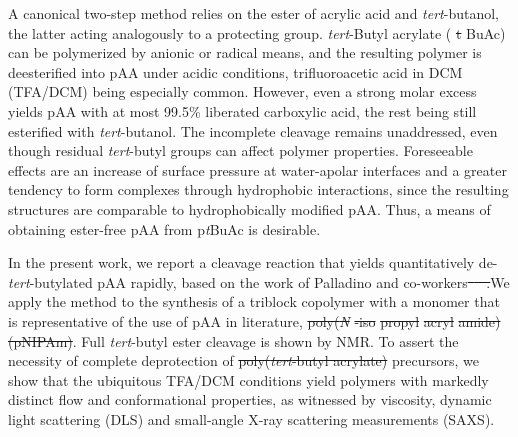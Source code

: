 \documentclass{article}
\providecommand{\DIFadd}[1]{{\protect\color{blue}\uwave{#1}}} %
\providecommand{\DIFdel}[1]{{\protect\color{red}\sout{#1}}}                      %
\providecommand{\DIFaddbegin}{} %
\providecommand{\DIFaddend}{} %
\providecommand{\DIFdelbegin}{} %
\providecommand{\DIFdelend}{} %
\begin{document}
A canonical two-step method relies on the ester of acrylic acid and \emph{tert}-butanol, the latter acting analogously to a protecting group. 
\emph{tert}-Butyl acrylate (\DIFdelbegin %
\DIFdel{t}%
\DIFdelend \DIFaddbegin \emph{\DIFadd{t}}\DIFaddend BuAc) can be polymerized by anionic or radical means, and the resulting polymer is deesterified into pAA under acidic conditions,
trifluoroacetic acid in DCM (TFA/DCM) being especially common. \cite{Dulong2015, Yong2016, Chen2013a, Li2006, Li2008a, Lauber2017} 
However, even a strong molar excess yields pAA with at most 99.5\% liberated 
carboxylic acid, the rest being still esterified with 
\emph{tert}-butanol.\cite{Loiseau2003a, Chen2013a}  The 
incomplete cleavage remains unaddressed, even though residual \emph{tert}-butyl groups 
can affect polymer properties. Foreseeable effects are an increase of surface pressure at water-apolar interfaces and a greater tendency to 
form complexes through hydrophobic interactions, since the resulting structures are comparable to hydrophobically modified pAA. Thus, a means 
of obtaining ester-free pAA from p\emph{t}BuAc is desirable.

In the present work, we report a cleavage reaction that yields quantitatively de-\emph{
tert}-butylated pAA rapidly, based on the work of 
Palladino and co-workers\DIFdelbegin \DIFdel{\mbox{%
\cite{Palladino2012}
}%
.}\DIFdelend \DIFaddbegin \DIFadd{.\mbox{%
\cite{Palladino2012}
}%
}\DIFaddend We apply the method to the synthesis of a 
triblock copolymer with a monomer that is representative \cite{Lue2011, Schilli2004a}
of the use of pAA in literature, \DIFdelbegin \DIFdel{poly(}\emph{\DIFdel{N}}%
\DIFdel{-iso}%
\DIFdel{propyl}%
\DIFdel{acryl}%
\DIFdel{amide) (pNIPAm)}\DIFdelend \DIFaddbegin \DIFadd{pNIPAm}\DIFaddend . Full 
\emph{tert}-butyl ester cleavage is shown
by NMR. To assert the necessity of complete deprotection of \DIFdelbegin \DIFdel{poly(}\DIFdelend \DIFaddbegin \DIFadd{p}\DIFaddend \emph{\DIFdelbegin \DIFdel{tert}\DIFdelend \DIFaddbegin \DIFadd{t}\DIFaddend }\DIFdelbegin \DIFdel{-butyl acrylate) }\DIFdelend \DIFaddbegin \DIFadd{BuAc }\DIFaddend precursors, we show that the ubiquitous 
TFA/DCM conditions yield polymers with markedly distinct flow and conformational properties, as witnessed by viscosity,
dynamic light scattering (DLS) and small-angle X-ray scattering measurements (SAXS).
\end{document}
